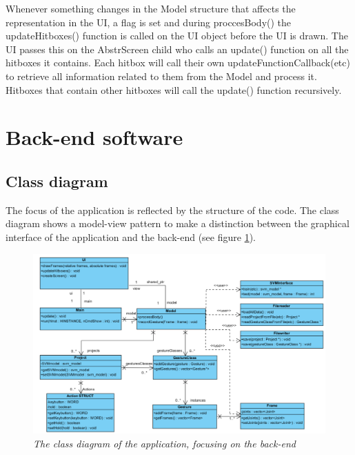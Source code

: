 Whenever something changes in the Model structure that affects the representation in the UI, a flag is set and during proccesBody() the updateHitboxes() function is called on the UI object before the UI is drawn. The UI passes this on the Abstr\textunderscore Screen child who calls an update() function on all the hitboxes it contains. Each hitbox will call their own updateFunctionCallback(etc) to retrieve all information related to them from the Model and process it. Hitboxes that contain other hitboxes will call the update() function recursively.




\section{Back-end software}

\subsection{Class diagram}

The focus of the application is reflected by the structure of the code. The class diagram shows a model-view pattern to make a distinction between the graphical interface of the application and the back-end (see figure \ref{fig: backend_classdiagram}).\\

\begin{figure}[H]
\begin{center}
\includegraphics[width=14cm]{ClassDiagramBackEnd.png}
\caption{\emph{The class diagram of the application, focusing on the back-end}}
\label{fig: backend_classdiagram}
\end{center}
\end{figure}

